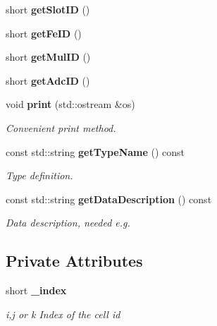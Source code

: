 \begin{DoxyCompactItemize}
\item 
short {\bfseries get\-Slot\-I\-D} ()\label{classCALICE_1_1CellMappingHcal_a83ae95e889acadd9e666421021fc94bd}

\item 
short {\bfseries get\-Fe\-I\-D} ()\label{classCALICE_1_1CellMappingHcal_a0a0f4e3978887fcb96c2990ad98c7ff8}

\item 
short {\bfseries get\-Mul\-I\-D} ()\label{classCALICE_1_1CellMappingHcal_ac15468dcd4948f44a67978680748aa54}

\item 
short {\bfseries get\-Adc\-I\-D} ()\label{classCALICE_1_1CellMappingHcal_a877867886306a01fe319eab0b00f7256}

\item 
void {\bf print} (std\-::ostream \&os)\label{classCALICE_1_1CellMappingHcal_a2ffe99f7db6ac95b8e972b37d189f6da}

\begin{DoxyCompactList}\small\item\em Convenient print method. \end{DoxyCompactList}\item 
const std\-::string {\bf get\-Type\-Name} () const \label{classCALICE_1_1CellMappingHcal_a03e821c39e5e6452c89954ddcc5038c8}

\begin{DoxyCompactList}\small\item\em Type definition. \end{DoxyCompactList}\item 
const std\-::string {\bf get\-Data\-Description} () const 
\begin{DoxyCompactList}\small\item\em Data description, needed e.\-g. \end{DoxyCompactList}\end{DoxyCompactItemize}
\subsection*{Private Attributes}
\begin{DoxyCompactItemize}
\item 
short {\bf \-\_\-index}\label{classCALICE_1_1CellMappingHcal_ac042db1cac41c0a080364c6ed8e6e4f5}

\begin{DoxyCompactList}\small\item\em i,j or k Index of the cell id \end{DoxyCompactList}\end{DoxyCompactItemize}



